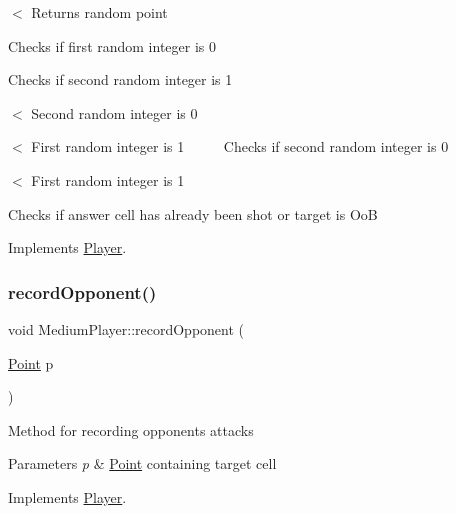 $<$ Returns random point

Checks if first random integer is 0

Checks if second random integer is 1

$<$ Second random integer is 0

$<$ First random integer is 1 ~\newline
~\newline
~\newline
 Checks if second random integer is 0

$<$ First random integer is 1

Checks if answer cell has already been shot or target is OoB 

Implements \mbox{\hyperlink{class_player_a2cc7a83d11158eafd8d49d4b9f23ce56}{Player}}.

\mbox{\label{class_medium_player_a6183d4a8fe3d68419afcfa9e33cd5928}} 
\subsubsection{\texorpdfstring{record\+Opponent()}{recordOpponent()}}
{\footnotesize\ttfamily void Medium\+Player\+::record\+Opponent (\begin{DoxyParamCaption}\item[{\mbox{\hyperlink{class_point}{Point}}}]{p }\end{DoxyParamCaption})\hspace{0.3cm}{\ttfamily [virtual]}}

Method for recording opponent\textquotesingle{}s attacks 
\begin{DoxyParams}{Parameters}
{\em p} & \mbox{\hyperlink{class_point}{Point}} containing target cell \\
\hline
\end{DoxyParams}


Implements \mbox{\hyperlink{class_player_a768e14edee61e208e6fd295cdd72a49c}{Player}}.

\mbox{\label{class_medium_player_aeadd8498cba5c447afbb5a0eb7408285}} 
